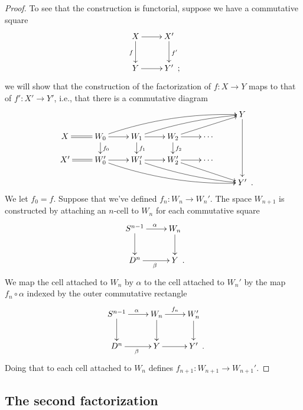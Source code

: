\documentclass{amsart}
\numberwithin{equation}{section}
\theoremstyle{slplain}
\theoremstyle{definition}
\theoremstyle{remark}
\newcommand{\Period}{\rlap{\enspace .}}
\newcommand{\Semicolon}{\rlap{\enspace ;}}
\begin{document}
\begin{proof}
  To see that the construction is functorial, suppose we have a
  commutative square
  \begin{displaymath}
    \xymatrix{
      {X} \ar[r] \ar[d]_{f}
      & {X'} \ar[d]^{f'}\\
      {Y} \ar[r]
      & {Y' \Semicolon}
    }
  \end{displaymath}
  we will show that the construction of the factorization of $f\colon
  X \to Y$ maps to that of $f'\colon X' \to Y'$, i.e., that there is a
  commutative diagram
  \begin{displaymath}
    \xymatrix@R=3ex{
      &&&&& {Y} \ar[ddd] \\
      {X} \ar@{=}[r]
      & {W_{0}} \ar[r] \ar[d]^{f_{0}} \ar@/^{2ex}/[rrrru]
      & {W_{1}} \ar[r] \ar[d]^{f_{1}} \ar@/^{1ex}/[rrru]
      & {W_{2}} \ar[r] \ar[d]^{f_{2}} \ar[rru]
      & {\cdots} \\
      {X'} \ar@{=}[r]
      & {W_{0}'} \ar[r] \ar@/_{2ex}/[rrrrd]
      & {W_{1}'} \ar[r] \ar@/_{1ex}/[rrrd]
      & {W_{2}'} \ar[r] \ar[rrd]
      & {\cdots} \\
      &&&&& {Y' \Period}
    }
  \end{displaymath}
  We let $f_{0} = f$.  Suppose that we've defined $f_{n}\colon W_{n}
  \to W_{n}'$.  The space $W_{n+1}$ is constructed by attaching an
  $n$-cell to $W_{n}$ for each commutative square
  \begin{displaymath}
    \xymatrix{
      {S^{n-1}} \ar[r]^{\alpha} \ar[d]
      & {W_{n}} \ar[d]\\
      {D^{n}} \ar[r]_{\beta}
      & {Y \Period}
    }
  \end{displaymath}
  We map the cell attached to $W_{n}$ by $\alpha$ to the cell attached
  to $W_{n}'$ by the map $f_{n}\circ \alpha$ indexed by the outer
  commutative rectangle
  \begin{displaymath}
    \xymatrix{
      {S^{n-1}} \ar[r]^{\alpha} \ar[d]
      & {W_{n}} \ar[d] \ar[r]^{f_{n}}
      & {W_{n}'} \ar[d]\\
      {D^{n}} \ar[r]_{\beta}
      & {Y} \ar[r]
      & {Y' \Period}
    }
  \end{displaymath}
  Doing that to each cell attached to $W_{n}$ defines $f_{n+1}\colon
  W_{n+1} \to W_{n+1}'$.
\end{proof}

\subsection{The second factorization}
\label{sec:FactSecond}
\end{document}
